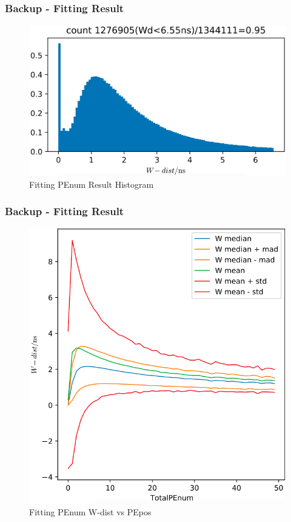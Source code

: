 \documentclass{beamer}
\begin{document}
\begin{frame}[noframenumbering]
\thispagestyle{empty}
\frametitle{Backup - Fitting Result}
\begin{figure}
    \centering
    \caption{Fitting PEnum Result Histogram}
    \includegraphics[width=0.85\linewidth]{img/xiaopeippenumhist.png}
\end{figure}
\end{frame}

\begin{frame}[noframenumbering]
\thispagestyle{empty}
\frametitle{Backup - Fitting Result}
\setlength{\abovecaptionskip}{0mm}
\setlength{\belowcaptionskip}{0mm}
\begin{figure}
    \centering
    \caption{Fitting PEnum W-dist vs PEpos}
    \includegraphics[width=0.65\linewidth]{img/xiaopeippenumstats.png}
\end{figure}
\end{frame}
\end{document}
